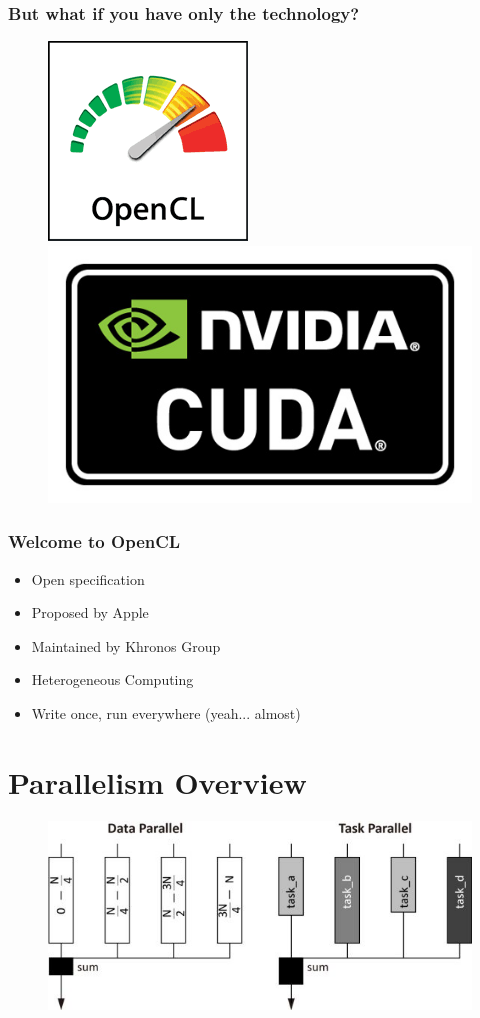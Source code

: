 \documentclass{beamer}
\begin{document}
  \frame
  {
    \frametitle{But what if you have only the technology?}
	\begin{figure}
      \scalebox{0.50}
      {
        \includegraphics{opencl.png}
      }
            \scalebox{0.30}
      {
        \includegraphics{cuda.jpg}
      }
    \end{figure}
  }
  
  \frame
  {
	\frametitle{Welcome to OpenCL}
    \begin{itemize}
    \item<1-> Open specification
    \item<2-> Proposed by Apple
    \item<3-> Maintained by Khronos Group
    \item<4-> Heterogeneous Computing
    \item<5-> Write once, run everywhere (yeah... almost)      
    \end{itemize}  
  }

  \section{Parallelism Overview}

  \frame
  {
  	\begin{figure}
        \includegraphics{parallelism-types.jpg}
    \end{figure}
  }
\end{document}
